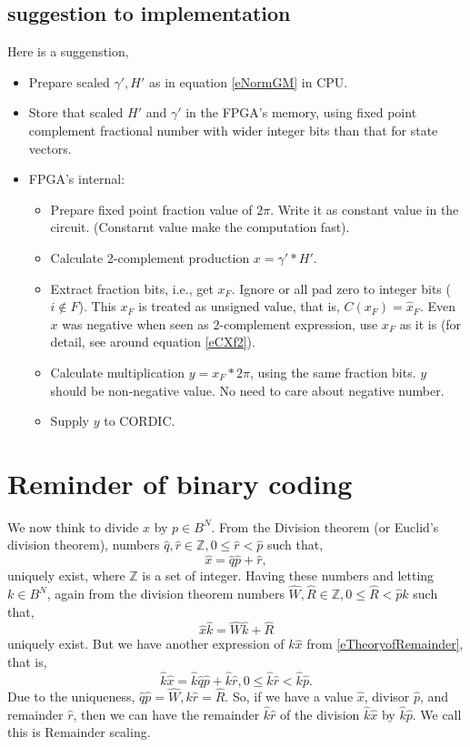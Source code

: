 \documentclass[a4paper]{article}
\newcommand{\eqlabel}[1]{\label{#1}
}
\newcommand{\sZ}{\mathbb{Z}}
\newcommand{\hx}{{\hat{x}}}
\newcommand{\hp}{{\hat{p}}}
\newcommand{\hr}{{\hat{r}}}
\newcommand{\hq}{{\hat{q}}}
\newcommand{\hk}{{\hat{k}}}
\begin{document}
\subsection{suggestion to implementation}
Here is a suggenstion, 
\begin{itemize}
    \item Prepare scaled \(\gamma', H'\) as in equation \eqref{eNormGM} in CPU.
    \item Store that scaled \(H'\) and \(\gamma'\) in the FPGA's memory, using fixed point complement fractional number with wider integer bits than that for state vectors.
    \item FPGA's internal:
    \begin{itemize}
        \item Prepare fixed point fraction value of \(2\pi\). Write it as constant value in the circuit. (Constarnt value make the computation fast).
        \item Calculate 2-complement production \(x = \gamma'* H'\).
        \item Extract fraction bits, i.e., get \(x_F\). Ignore or all pad zero to integer bits (\(i\not\in F\)). This \(x_F\) is treated as unsigned value, that is, \(C(x_F) = \hx_F\). Even \(x\) was negative when seen as 2-complement expression, use \(x_F\) as it is (for detail, see around equation \eqref{eCXf2}).
        \item Calculate multiplication \(y = x_F * 2\pi\), using the same fraction bits. \(y\) should be non-negative value. No need to care about negative number.
        \item Supply \(y\) to CORDIC.
    \end{itemize}
\end{itemize}
\section{Reminder of binary coding}
\label{sMain}
We now think to divide \(x\) by \(p\in B^N\). From the Division theorem (or Euclid's division theorem), numbers \(\hq, \hr\in \sZ, 0 \leq \hr < \hp\) such that,
\begin{equation}
    \eqlabel{eTheoryofRemainder}
    \hx = \hq \hp + \hr,
\end{equation}
uniquely exist, where \(\sZ\) is a set of integer. Having these numbers and letting \(k\in B^N\), again from the division theorem numbers \(\hat{W}, \hat{R}\in \sZ, 0 \leq \hat{R} < \hp k\) such that,
\begin{equation}
    \eqlabel{eMultiDiv}
\hx \hk= \hat{W} \hk + \hat{R}
\end{equation}
uniquely exist. But we have another expression of \(k\hx \) from \eqref{eTheoryofRemainder}, that is, 
\[
    \hk \hx = \hk\hq \hp + \hk\hr, 0\leq \hk \hr < \hk\hp.
\]
Due to the uniqueness, \(\hq \hp = \hat{W}, k\hr = \hat{R}\). So, if we have a value \(\hx\), divisor \(\hp\), and remainder \(\hr\), then we can have the remainder \(\hk \hr \) of the division  \(\hk \hx\) by \(\hk\hp\). We call this is Remainder scaling.
\end{document}
